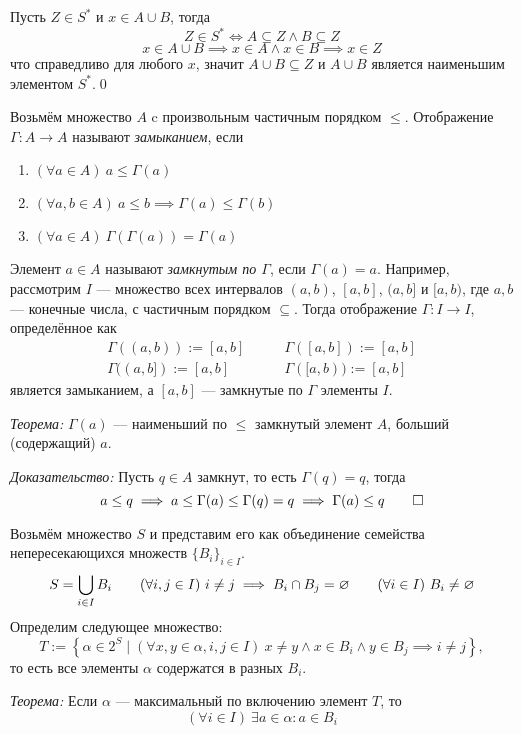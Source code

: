 Пусть $Z\in S^{*}$ и $x\in A\cup B$, тогда
\[
	Z\in S^{*}\iff A\subseteq Z\land B\subseteq Z
\]
\[
	x\in A\cup B\implies x\in A\land x\in B\implies x\in Z
\]
что справедливо для любого $x$,
значит $A\cup B\subseteq Z$ и $A\cup B$ является наименьшим элементом $S^{*}$.\qed

Возьмём множество $A$ c произвольным частичным порядком $\leq$. Отображение
$\Gamma:A\to A$ называют {\it замыканием}, если
\begin{enumerate}
	\item{}$(\forall a\in A)~a\leq\Gamma(a)$
	\item{}$(\forall a,b\in A)~a\leq b\implies \Gamma(a)\leq \Gamma(b)$
	\item{}$(\forall a\in A)~\Gamma(\Gamma(a))=\Gamma(a)$
\end{enumerate}
Элемент ${a\in A}$ называют {\it замкнутым по $\Gamma$}, если ${\Gamma(a)=a}$.
Например, рассмотрим $I$ --- множество всех интервалов $(a,b)$, $[a,b]$, $(a,b]$
и $[a,b)$, где $a,b$ --- конечные числа, с частичным порядком $\subseteq$.
Тогда отображение $\Gamma:I\to I$, определённое как
\[\begin{array}{ll}
	\Gamma((a,b)):=[a,b]\qquad &\Gamma([a,b]):=[a,b]\\
	\Gamma((a,b]):=[a,b]\qquad &\Gamma([a,b)):=[a,b]
\end{array}
\]
является замыканием, а $[a,b]$ --- замкнутые по $\Gamma$ элементы $I$.

\vspace{1em}
{\it Теорема:} $\Gamma(a)$ --- наименьший по $\leq$ замкнутый элемент $A$,
больший (содержащий) $a$.

{\it Доказательство:}
Пусть $q\in A$ замкнут, то есть $\Gamma(q)=q$, тогда
\[
	a\leq q\implies a\leq \Gamma(a)\leq \Gamma(q)=q\implies\Gamma(a)\leq q\qed
\]

Возьмём множество $S$ и представим его как объединение семейства непересекающихся
множеств $\{B_{i}\}_{i\in I}$.
\[
	S=\bigcup_{i\in I}B_{i}\qquad
	(\forall i,j\in I)~i\neq j\implies B_{i}\cap B_{j}=\varnothing\qquad
	(\forall i\in I)~B_{i}\neq\varnothing
\]
Определим следующее множество:
\[
	T:=\left\{\alpha\in 2^{S}\;\big|\; (\forall x,y\in\alpha,i,j\in I)~
	x\neq y\land	x\in B_{i}\land y\in B_{j}\implies i\neq j\right\},
\]
то есть все элементы $\alpha$ содержатся в разных $B_{i}$.

\vspace{1em}
{\it Теорема:} Если $\alpha$ --- максимальный по включению элемент $T$, то
\[
	(\forall i\in I)~\exists a\in\alpha:a\in B_{i}
\]

